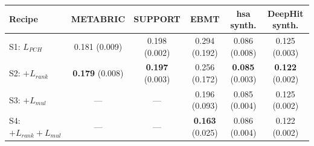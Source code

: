 \begin{tabular}{lccccc}
\toprule
Recipe & METABRIC & SUPPORT & EBMT & hsa synth. & DeepHit synth. \\
\midrule
S1: $L_{PCH}$ & 0.181 (0.009) & 0.198 (0.002) & 0.294 (0.192) & 0.086 (0.008) & 0.125 (0.003) \\
S2: $+L_{rank}$ & \textbf{0.179} (0.008) & \textbf{0.197} (0.003) & 0.256 (0.172) & \textbf{0.085} (0.003) & \textbf{0.122} (0.002) \\
S3: $+L_{mul}$ & --- & --- & 0.196 (0.093) & 0.085 (0.004) & 0.125 (0.002) \\
S4: $+L_{rank}+L_{mul}$ & --- & --- & \textbf{0.163} (0.025) & 0.086 (0.004) & 0.122 (0.002) \\
\bottomrule
\end{tabular}
